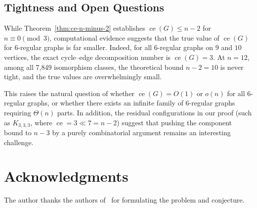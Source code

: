 \documentclass[11pt,reqno]{amsart}
\theoremstyle{definition}
\theoremstyle{remark}
\DeclareMathOperator{\ce}{ce}
\begin{document}
\subsection{Tightness and Open Questions}
While Theorem~\ref{thm:ce-n-minus-2} establishes $\ce(G) \le n-2$ for $n \equiv 0 \pmod 3$, computational evidence suggests that the true value of $\ce(G)$ for $6$-regular graphs is far smaller. Indeed, for all 6-regular graphs on $9$ and $10$ vertices, the exact cycle--edge decomposition number is $\ce(G) = 3$. At $n = 12$, among all 7,849 isomorphism classes, the theoretical bound $n-2 = 10$ is never tight, and the true values are overwhelmingly small. 

This raises the natural question of whether $\ce(G) = O(1)$ or $o(n)$ for all 6-regular graphs, or whether there exists an infinite family of 6-regular graphs requiring $\Theta(n)$ parts. In addition, the residual configurations in our proof (such as $K_{3,3,3}$, where $\ce = 3 \ll 7 = n-2$) suggest that pushing the component bound to $n-3$ by a purely combinatorial argument remains an interesting challenge.

\section*{Acknowledgments}
The author thanks the authors of~\cite{AABC25} for formulating the problem and conjecture.
\end{document}
